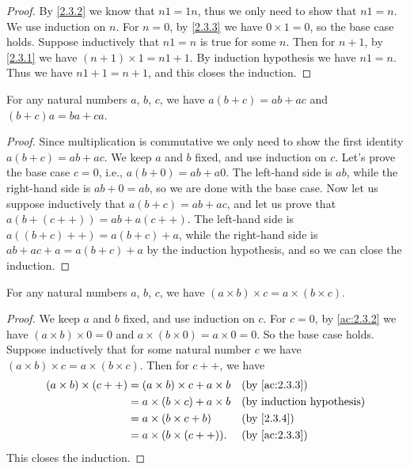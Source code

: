\begin{proof}
  By \cref{2.3.2} we know that \(n1 = 1n\), thus we only need to show that \(n1 = n\).
  We use induction on \(n\).
  For \(n=0\), by \cref{2.3.3} we have \(0 \times 1 = 0\), so the base case holds.
  Suppose inductively that \(n1 = n\) is true for some \(n\).
  Then for \(n + 1\), by \cref{2.3.1} we have \((n + 1) \times 1 = n1 + 1\).
  By induction hypothesis we have \(n1 = n\).
  Thus we have \(n1 + 1 = n + 1\), and this closes the induction.
\end{proof}

\begin{prop}\label{2.3.4}
  For any natural numbers \(a\), \(b\), \(c\), we have \(a(b + c) = ab + ac\) and \((b + c)a = ba + ca\).
\end{prop}

\begin{proof}
  Since multiplication is commutative we only need to show the first identity \(a(b + c) = ab + ac\).
  We keep \(a\) and \(b\) fixed, and use induction on \(c\).
  Let's prove the base case \(c = 0\), i.e., \(a(b + 0) = ab + a0\).
  The left-hand side is \(ab\), while the right-hand side is \(ab + 0 = ab\), so we are done with the base case.
  Now let us suppose inductively that \(a(b + c) = ab + ac\), and let us prove that \(a(b + (c++)) = ab + a(c++)\).
  The left-hand side is \(a((b + c)++) = a(b + c) + a\), while the right-hand side is \(ab + ac + a = a(b + c) + a\) by the induction hypothesis, and so we can close the induction.
\end{proof}

\begin{prop}\label{2.3.5}
  For any natural numbers \(a\), \(b\), \(c\), we have \((a \times b) \times c = a \times (b \times c)\).
\end{prop}

\begin{proof}
  We keep \(a\) and \(b\) fixed, and use induction on \(c\).
  For \(c = 0\), by \cref{ac:2.3.2} we have \((a \times b) \times 0 = 0\) and \(a \times (b \times 0) = a \times 0 = 0\).
  So the base case holds.
  Suppose inductively that for some natural number \(c\) we have \((a \times b) \times c = a \times (b \times c)\).
  Then for \(c++\), we have
  \begin{align*}
    (a \times b) \times (c++) & = (a \times b) \times c + a \times b &  & \text{(by \cref{ac:2.3.3})}      \\
                              & = a \times (b \times c) + a \times b &  & \text{(by induction hypothesis)} \\
                              & = a \times (b \times c + b)          &  & \text{(by \cref{2.3.4})}         \\
                              & = a \times (b \times (c++)).         &  & \text{(by \cref{ac:2.3.3})}
  \end{align*}
  This closes the induction.
\end{proof}

